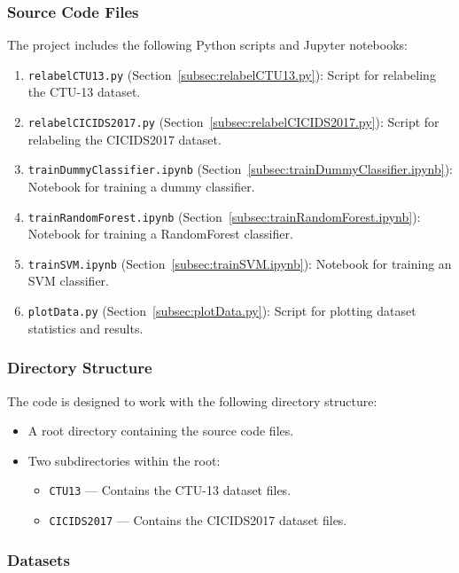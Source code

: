 \subsubsection{Source Code Files}

The project includes the following Python scripts and Jupyter notebooks:

\begin{enumerate}
    \item \texttt{relabelCTU13.py} (Section~\ref{subsec:relabelCTU13.py}): Script for relabeling the CTU-13 dataset.
    \item \texttt{relabelCICIDS2017.py} (Section~\ref{subsec:relabelCICIDS2017.py}): Script for relabeling the CICIDS2017 dataset.
    \item \texttt{trainDummyClassifier.ipynb} (Section~\ref{subsec:trainDummyClassifier.ipynb}): Notebook for training a dummy classifier.
    \item \texttt{trainRandomForest.ipynb} (Section~\ref{subsec:trainRandomForest.ipynb}): Notebook for training a RandomForest classifier.
    \item \texttt{trainSVM.ipynb} (Section~\ref{subsec:trainSVM.ipynb}): Notebook for training an SVM classifier.
    \item \texttt{plotData.py} (Section~\ref{subsec:plotData.py}): Script for plotting dataset statistics and results.
\end{enumerate}

\subsubsection{Directory Structure}

The code is designed to work with the following directory structure:

\begin{itemize}
    \item A root directory containing the source code files.
    \item Two subdirectories within the root:
    \begin{itemize}
        \item \texttt{CTU13} --- Contains the CTU-13 dataset files.
        \item \texttt{CICIDS2017} --- Contains the CICIDS2017 dataset files.
    \end{itemize}
\end{itemize}

\subsubsection{Datasets}

